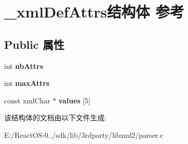 \hypertarget{struct__xml_def_attrs}{}\section{\+\_\+xml\+Def\+Attrs结构体 参考}
\label{struct__xml_def_attrs}
\subsection*{Public 属性}
\begin{DoxyCompactItemize}
\item 
\mbox{\label{struct__xml_def_attrs_a20197d4be34aea8ce0d55388824cf4f1}} 
int {\bfseries nb\+Attrs}
\item 
\mbox{\label{struct__xml_def_attrs_ac8d212729562bf535f1615489df631d4}} 
int {\bfseries max\+Attrs}
\item 
\mbox{\label{struct__xml_def_attrs_a789025997d65fa70ef04fda8a1cb640c}} 
const xml\+Char $\ast$ {\bfseries values} \mbox{[}5\mbox{]}
\end{DoxyCompactItemize}


该结构体的文档由以下文件生成\+:\begin{DoxyCompactItemize}
\item 
E\+:/\+React\+O\+S-\/0../sdk/lib/3rdparty/libxml2/parser.\+c\end{DoxyCompactItemize}
